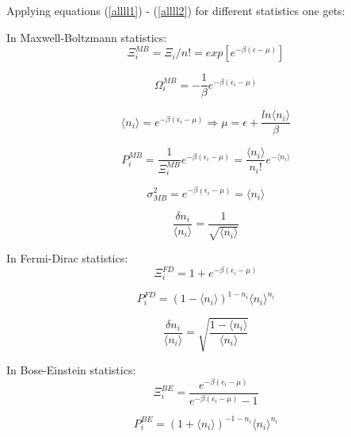 \documentclass[10pt]{article}
\begin{document}
Applying equations (\ref{allll1}) - (\ref{allll2}) for different statistics one gets:

In Maxwell-Boltzmann statistics:
\begin{equation}
\Xi_i^{MB} = \Xi_i/n! = exp[e^{-\beta (\epsilon - \mu)}]
\end{equation}

\begin{equation}
\Omega_i^{MB} = -\frac{1}{\beta} e^{-\beta (\epsilon_i - \mu)}
\end{equation}

\begin{equation}
\langle n_i\rangle  =  e^{-\beta (\epsilon_i - \mu)} \Rightarrow \mu = \epsilon + \frac{ln\langle n_i\rangle }{\beta}
\end{equation}

\begin{equation}
P_i^{MB} = \frac{1}{\Xi_i^{MB}} e^{-\beta (\epsilon_i - \mu)} = \frac{\langle n_i\rangle }{n_i!}e^{-\langle n_i\rangle }
\end{equation}

\begin{equation}
\sigma^2_{MB} = e^{-\beta (\epsilon_i - \mu)} = \langle n_i\rangle
\end{equation}

\begin{equation}
\frac{\delta n_i}{\langle n_i\rangle} = \frac{1}{\sqrt{\langle n_i\rangle}}
\end{equation}

In Fermi-Dirac statistics:
\begin{equation}
\Xi_i^{FD} = 1 + e^{-\beta (\epsilon_i - \mu)}
\end{equation}


\begin{equation}
P_i^{FD} = (1-\langle n_i\rangle)^{1-n_i} \langle n_i\rangle ^{n_i}
\end{equation}


\begin{equation}
\frac{\delta n_i}{\langle n_i\rangle} = \sqrt{\frac{1 - \langle n_i\rangle}{\langle n_i\rangle}}
\end{equation}

In Bose-Einstein statistics:
\begin{equation}
\Xi_i^{BE} = \frac{e^{-\beta (\epsilon_i - \mu)}}{e^{-\beta (\epsilon_i - \mu)} -1}
\end{equation}

\begin{equation}
P_i^{BE} = (1 + \langle n_i\rangle)^{-1 - n_i} \langle n_i\rangle ^{n_i}
\end{equation}
\end{document}
